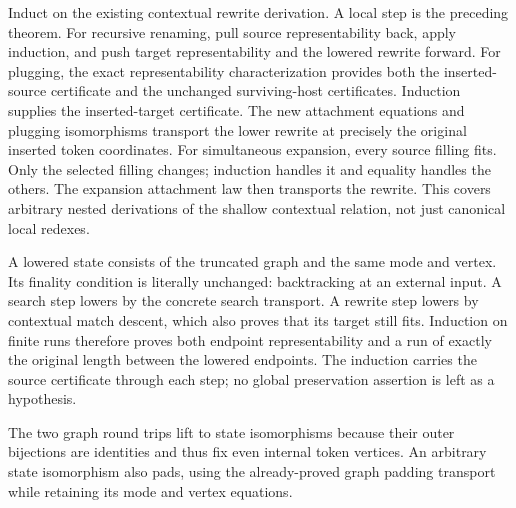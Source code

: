 Induct on the existing contextual rewrite derivation. A local step is
the preceding theorem. For recursive renaming, pull source representability
back, apply induction, and push target representability and the lowered
rewrite forward. For plugging, the exact representability characterization
provides both the inserted-source certificate and the unchanged surviving-host
certificates. Induction supplies the inserted-target certificate. The new
attachment equations and plugging isomorphisms transport the lower rewrite
at precisely the original inserted token coordinates. For simultaneous
expansion, every source filling fits. Only the selected filling changes;
induction handles it and equality handles the others. The expansion attachment
law then transports the rewrite. This covers arbitrary nested derivations of
the shallow contextual relation, not just canonical local redexes.


A lowered state consists of the truncated graph and the same mode and
vertex. Its finality condition is literally unchanged: backtracking at an
external input. A search step lowers by the concrete search transport. A
rewrite step lowers by contextual match descent, which also proves that its
target still fits. Induction on finite runs therefore proves both endpoint
representability and a run of exactly the original length between the
lowered endpoints. The induction carries the source certificate through each
step; no global preservation assertion is left as a hypothesis.





The two graph round trips lift to state isomorphisms because their
outer bijections are identities and thus fix even internal token vertices.
An arbitrary state isomorphism also pads, using the already-proved graph
padding transport while retaining its mode and vertex equations.



